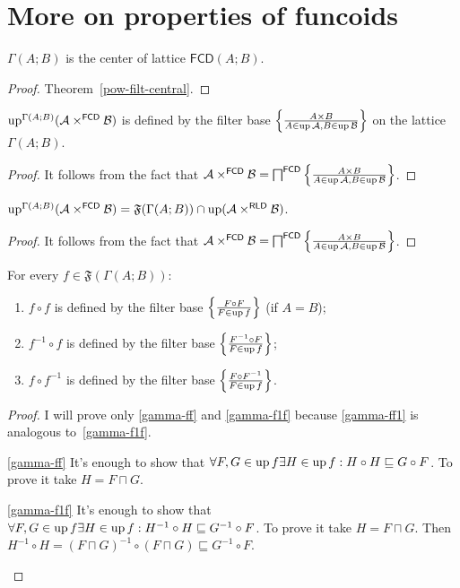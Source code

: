 \section{More on properties of funcoids}
\begin{prop}
$\Gamma(A;B)$ is the center of lattice $\mathsf{FCD}(A;B)$.\end{prop}
\begin{proof}
Theorem~\ref{pow-filt-central}.\end{proof}
\begin{prop}
$\operatorname{up}^{\Gamma(A;B)}(\mathcal{A}\times^{\mathsf{FCD}}\mathcal{B})$
is defined by the filter base $\left\{ \frac{A\times B}{A\in\operatorname{up}\mathcal{A},B\in\operatorname{up}\mathcal{B}}\right\}$
on the lattice $\Gamma(A;B)$.\end{prop}
\begin{proof}
It follows from the fact that $\mathcal{A}\times^{\mathsf{FCD}}\mathcal{B}=\bigsqcap^{\mathsf{FCD}}\left\{ \frac{A\times B}{A\in\operatorname{up}\mathcal{A},B\in\operatorname{up}\mathcal{B}}\right\}$.\end{proof}
\begin{prop}
$\operatorname{up}^{\Gamma(A;B)}(\mathcal{A}\times^{\mathsf{FCD}}\mathcal{B})=\mathfrak{F}(\Gamma(A;B))\cap\operatorname{up}(\mathcal{A}\times^{\mathsf{RLD}}\mathcal{B})$.\end{prop}
\begin{proof}
It follows from the fact that $\mathcal{A}\times^{\mathsf{FCD}}\mathcal{B}=\bigsqcap^{\mathsf{FCD}}\left\{ \frac{A\times B}{A\in\operatorname{up}\mathcal{A},B\in\operatorname{up}\mathcal{B}}\right\}$.\end{proof}
\begin{prop}
For every $f\in\mathfrak{F}(\Gamma(A;B))$:
\begin{enumerate}
\item \label{gamma-ff}$f\circ f$ is defined by the filter base $\left\{ \frac{F\circ F}{F\in\operatorname{up} f}\right\}$
(if $A=B$);
\item \label{gamma-f1f}$f^{-1}\circ f$ is defined by the filter base $\left\{ \frac{F^{-1}\circ F}{F\in\operatorname{up} f}\right\}$;
\item \label{gamma-ff1}$f\circ f^{-1}$ is defined by the filter base $\left\{ \frac{F\circ F^{-1}}{F\in\operatorname{up} f}\right\}$.
\end{enumerate}
\end{prop}
\begin{proof}
I will prove only \ref{gamma-ff} and \ref{gamma-f1f} because \ref{gamma-ff1}
is analogous to~\ref{gamma-f1f}.
\begin{widedisorder}
\item [{\ref{gamma-ff}}] It's enough to show that $\forall F,G\in\operatorname{up} f\exists H\in\operatorname{up} f:H\circ H\sqsubseteq G\circ F$.
To prove it take $H=F\sqcap G$.
\item [{\ref{gamma-f1f}}] It's enough to show that $\forall F,G\in\operatorname{up} f\exists H\in\operatorname{up} f:H^{-1}\circ H\sqsubseteq G^{-1}\circ F$.
To prove it take $H=F\sqcap G$. Then $H^{-1}\circ H=(F\sqcap G)^{-1}\circ(F\sqcap G)\sqsubseteq G^{-1}\circ F$.
\end{widedisorder}
\end{proof}
